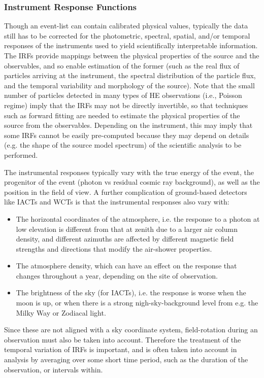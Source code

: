 \documentclass[11pt,a4paper]{ivoa}
\begin{document}
\subsubsection{Instrument Response Functions}

Though an event-list can contain calibrated physical values, typically the data still has to be corrected for the photometric, spectral, spatial, and/or temporal responses of the instruments used to yield scientifically interpretable information. The IRFs provide mappings between the physical properties of the source and the observables, and so enable estimation of the former (such as the real flux of particles arriving at the instrument, the spectral distribution of the particle flux, and the temporal variability and morphology of the source).  Note that the small number of particles detected in many types of HE observations (i.e., Poisson regime) imply that the IRFs may not be directly invertible, so that techniques such as forward fitting are needed to estimate the physical properties of the source from the observables.  Depending on the instrument, this may imply that some IRFs cannot be easily pre-computed because they may depend on details (e.g. the shape of the source model spectrum) of the scientific analysis to be performed.

The instrumental responses typically vary with the true energy of the event, the progenitor of the event (photon vs residual cosmic ray background), as well as the position in the field of view.
A further complication of ground-based detectors like IACTs and WCTs is that the instrumental responses also vary with:
\begin{itemize}
  \item The horizontal coordinates of the atmosphere, i.e. the response to a photon at low elevation is different from that at zenith due to a larger air column density, and different azimuths are affected by different magnetic field strengths and directions that modify the air-shower properties.
  \item The atmosphere density, which can have an effect on the response that changes throughout a year, depending on the site of observation.
  \item The brightness of the sky (for IACTs), i.e. the response is worse when the moon is up, or when there is a strong nigh-sky-background level from e.g. the Milky Way or Zodiacal light.
\end{itemize}
Since these are not aligned with a sky coordinate system, field-rotation during an observation must also be taken into account.
Therefore the treatment of the temporal variation of IRFs is important, and is often taken into account in analysis by averaging over some short time period, such as the duration of the observation, or intervals within.
\end{document}
